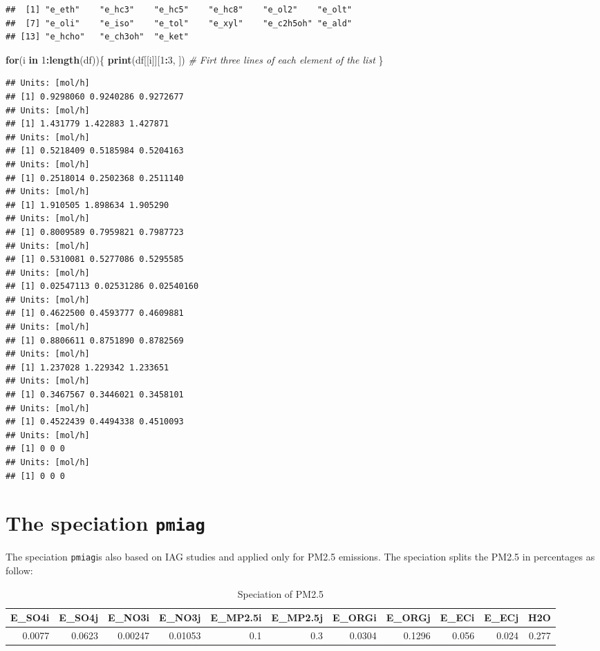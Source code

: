 \documentclass[12pt,graybox,envcountchap,sectrefs]{krantz}
\makeatletter
\newenvironment{Shaded}{\begin{snugshade}}{\end{snugshade}}
\newcommand{\KeywordTok}[1]{\textcolor[rgb]{0.13,0.29,0.53}{\textbf{#1}}}
\newcommand{\DecValTok}[1]{\textcolor[rgb]{0.00,0.00,0.81}{#1}}
\newcommand{\CommentTok}[1]{\textcolor[rgb]{0.56,0.35,0.01}{\textit{#1}}}
\newcommand{\ControlFlowTok}[1]{\textcolor[rgb]{0.13,0.29,0.53}{\textbf{#1}}}
\newcommand{\OperatorTok}[1]{\textcolor[rgb]{0.81,0.36,0.00}{\textbf{#1}}}
\newcommand{\NormalTok}[1]{#1}
\newenvironment{kframe}{%
\medskip{}
\setlength{\fboxsep}{.8em}
 \def\at@end@of@kframe{}%
 \ifinner\ifhmode%
  \def\at@end@of@kframe{\end{minipage}}%
  \begin{minipage}{\columnwidth}%
 \fi\fi%
 \def\FrameCommand##1{\hskip\@totalleftmargin \hskip-\fboxsep
 \colorbox{shadecolor}{##1}\hskip-\fboxsep
     \hskip-\linewidth \hskip-\@totalleftmargin \hskip\columnwidth}%
 \MakeFramed {\advance\hsize-\width
   \@totalleftmargin\z@ \linewidth\hsize
   \@setminipage}}%
 {\par\unskip\endMakeFramed%
 \at@end@of@kframe}
\renewenvironment{Shaded}{\begin{kframe}}{\end{kframe}}
\theoremstyle{definition}
\theoremstyle{definition}
\theoremstyle{definition}
\theoremstyle{remark}
\makeatother
\begin{document}
\begin{verbatim}
##  [1] "e_eth"    "e_hc3"    "e_hc5"    "e_hc8"    "e_ol2"    "e_olt"   
##  [7] "e_oli"    "e_iso"    "e_tol"    "e_xyl"    "e_c2h5oh" "e_ald"   
## [13] "e_hcho"   "e_ch3oh"  "e_ket"
\end{verbatim}

\begin{Shaded}
\begin{Highlighting}[]
\ControlFlowTok{for}\NormalTok{(i }\ControlFlowTok{in} \DecValTok{1}\OperatorTok{:}\KeywordTok{length}\NormalTok{(df))\{}
  \KeywordTok{print}\NormalTok{(df[[i]][}\DecValTok{1}\OperatorTok{:}\DecValTok{3}\NormalTok{, ]) }\CommentTok{# Firt three lines of each element of the list}
\NormalTok{\}}
\end{Highlighting}
\end{Shaded}

\begin{verbatim}
## Units: [mol/h]
## [1] 0.9298060 0.9240286 0.9272677
## Units: [mol/h]
## [1] 1.431779 1.422883 1.427871
## Units: [mol/h]
## [1] 0.5218409 0.5185984 0.5204163
## Units: [mol/h]
## [1] 0.2518014 0.2502368 0.2511140
## Units: [mol/h]
## [1] 1.910505 1.898634 1.905290
## Units: [mol/h]
## [1] 0.8009589 0.7959821 0.7987723
## Units: [mol/h]
## [1] 0.5310081 0.5277086 0.5295585
## Units: [mol/h]
## [1] 0.02547113 0.02531286 0.02540160
## Units: [mol/h]
## [1] 0.4622500 0.4593777 0.4609881
## Units: [mol/h]
## [1] 0.8806611 0.8751890 0.8782569
## Units: [mol/h]
## [1] 1.237028 1.229342 1.233651
## Units: [mol/h]
## [1] 0.3467567 0.3446021 0.3458101
## Units: [mol/h]
## [1] 0.4522439 0.4494338 0.4510093
## Units: [mol/h]
## [1] 0 0 0
## Units: [mol/h]
## [1] 0 0 0
\end{verbatim}

\section{\texorpdfstring{The speciation
\texttt{pmiag}}{The speciation pmiag}}\label{the-speciation-pmiag}

The speciation \texttt{pmiag}is also based on IAG studies and applied
only for PM2.5 emissions. The speciation splits the PM2.5 in percentages
as follow:

\begin{table}

\caption{\label{tab:unnamed-chunk-93}Speciation of PM2.5}
\centering
\begin{tabular}[t]{r|r|r|r|r|r|r|r|r|r|r}
\hline
E\_SO4i & E\_SO4j & E\_NO3i & E\_NO3j & E\_MP2.5i & E\_MP2.5j & E\_ORGi & E\_ORGj & E\_ECi & E\_ECj & H2O\\
\hline
0.0077 & 0.0623 & 0.00247 & 0.01053 & 0.1 & 0.3 & 0.0304 & 0.1296 & 0.056 & 0.024 & 0.277\\
\hline
\end{tabular}
\end{table}
\end{document}
